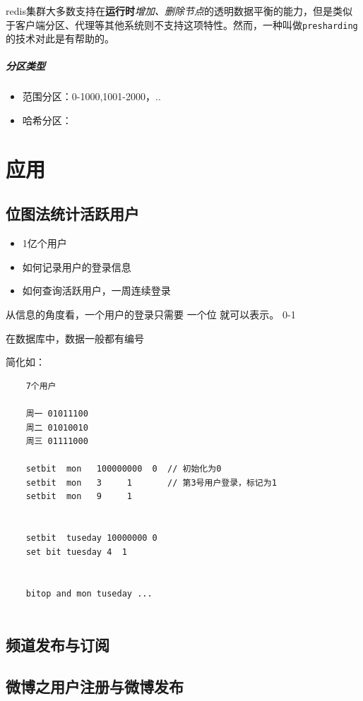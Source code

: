 \documentclass[UTF8,a4paper,12pt]{ctexbook}
\begin{document}
		redis集群大多数支持在\textbf{运行时}\textit{增加、删除节点}的透明数据平衡的能力，但是类似于客户端分区、代理等其他系统则不支持这项特性。然而，一种叫做\verb|presharding|的技术对此是有帮助的。
		
		\paragraph{分区类型}
			\begin{itemize}
				\item 范围分区：0-1000,1001-2000，..
				\item 哈希分区：
			\end{itemize}
			
\chapter{应用}	
	\section{位图法统计活跃用户}
		\begin{itemize}
			\item 1亿个用户
			\item 如何记录用户的登录信息
			\item 如何查询活跃用户，一周连续登录
		\end{itemize}
	
		从信息的角度看，一个用户的登录只需要 一个位 就可以表示。 0-1
		
		在数据库中，数据一般都有编号
		
		简化如：
			\begin{lstlisting}
	7个用户
	
	周一 01011100
	周二 01010010
	周三 01111000
	
	setbit  mon   100000000  0  // 初始化为0
	setbit  mon   3     1       // 第3号用户登录，标记为1
	setbit  mon   9     1
	
	
	setbit  tuseday 10000000 0
	set bit tuesday 4  1
	

	bitop and mon tuseday ...
	
			\end{lstlisting}
	\section{频道发布与订阅}
	
	\section{微博之用户注册与微博发布}
	
\end{document}
